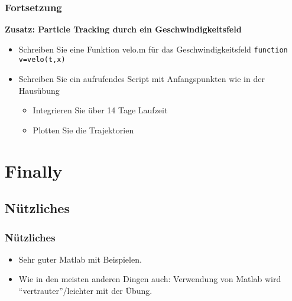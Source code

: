       \begin{frame}
		\frametitle{Fortsetzung}
          \begin{exercise}
              \sloppy
              \textbf{Zusatz: Particle Tracking durch ein Geschwindigkeitsfeld}
              \begin{itemize}
                \item Schreiben Sie eine Funktion velo.m für das Geschwindigkeitsfeld
\texttt{function v=velo(t,x)}
				\item Schreiben Sie ein aufrufendes Script mit Anfangspunkten wie in der Hausübung
				\begin{itemize}
					\item Integrieren Sie über 14 Tage Laufzeit
					\item Plotten Sie die Trajektorien
				\end{itemize}
              \end{itemize}
          \end{exercise}
      \end{frame}



  \section{Finally}

  \subsection{Nützliches}
  \begin{frame}
      \frametitle{Nützliches}
      \begin{itemize}
          \item Sehr guter Matlab  mit Beispielen.
          \item Wie in den meisten anderen Dingen auch: Verwendung von Matlab wird ``vertrauter''/leichter mit der Übung.
      \end{itemize}
  \end{frame}





